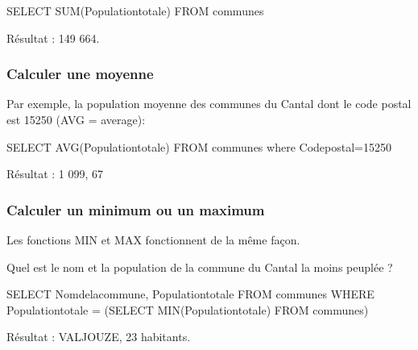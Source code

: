 \documentclass[
  a4paper,
  DIV=11,
  numbers=noendperiod]{scrartcl}
\newenvironment{Shaded}{\begin{snugshade}}{\end{snugshade}}
\newcommand{\DecValTok}[1]{\textcolor[rgb]{0.68,0.00,0.00}{#1}}
\newcommand{\FunctionTok}[1]{\textcolor[rgb]{0.28,0.35,0.67}{#1}}
\newcommand{\KeywordTok}[1]{\textcolor[rgb]{0.00,0.23,0.31}{#1}}
\newcommand{\NormalTok}[1]{\textcolor[rgb]{0.00,0.23,0.31}{#1}}
\newcommand{\OperatorTok}[1]{\textcolor[rgb]{0.37,0.37,0.37}{#1}}
\begin{document}
\begin{Shaded}
\begin{Highlighting}[]
\KeywordTok{SELECT} \FunctionTok{SUM}\NormalTok{(Populationtotale)}
\KeywordTok{FROM}\NormalTok{ communes}
\end{Highlighting}
\end{Shaded}

Résultat : 149 664.

\hypertarget{calculer-une-moyenne}{%
\subsubsection{Calculer une moyenne}\label{calculer-une-moyenne}}

Par exemple, la population moyenne des communes du Cantal dont le code
postal est 15250 (AVG = average):

\begin{Shaded}
\begin{Highlighting}[]
\KeywordTok{SELECT} \FunctionTok{AVG}\NormalTok{(Populationtotale)}
\KeywordTok{FROM}\NormalTok{ communes}
\KeywordTok{where}\NormalTok{ Codepostal}\OperatorTok{=}\DecValTok{15250}
\end{Highlighting}
\end{Shaded}

Résultat : 1 099, 67

\hypertarget{calculer-un-minimum-ou-un-maximum}{%
\subsubsection{Calculer un minimum ou un
maximum}\label{calculer-un-minimum-ou-un-maximum}}

Les fonctions MIN et MAX fonctionnent de la même façon.

Quel est le nom et la population de la commune du Cantal la moins
peuplée ?

\begin{Shaded}
\begin{Highlighting}[]
\KeywordTok{SELECT}\NormalTok{ Nomdelacommune, Populationtotale}
\KeywordTok{FROM}\NormalTok{ communes}
\KeywordTok{WHERE}\NormalTok{ Populationtotale }\OperatorTok{=}\NormalTok{ (}\KeywordTok{SELECT} \FunctionTok{MIN}\NormalTok{(Populationtotale) }\KeywordTok{FROM}\NormalTok{ communes)}
\end{Highlighting}
\end{Shaded}

Résultat : VALJOUZE, 23 habitants.
\end{document}
